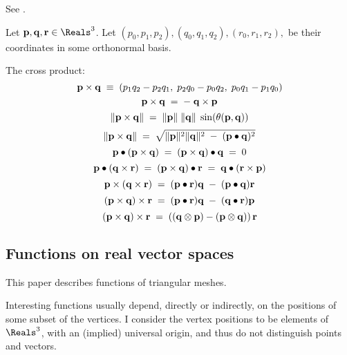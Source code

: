 See \cite[p. 85, ex. 4-9]{spivak-1965}.

Let $\p, \q, \r \in \Reals^3$.
Let $(p_0,p_1,p_2), (q_0,q_1,q_2), (r_0,r_1,r_2), $ be their coordinates
in some orthonormal basis.

The cross product:
\begin{equation}
{\mathbf p} \times {\mathbf q}  \; \equiv \; (p_1 q_2 - p_2 q_1, \; p_2 q_0 - p_0 q_2, \; p_0 q_1 - p_1 q_0)
\end{equation}
\begin{equation}
{\mathbf p} \times {\mathbf q}  \; = \; - \; {\mathbf q} \times {\mathbf p}
\end{equation}
\begin{equation}
\| {\mathbf p} \times {\mathbf q} \| \; = \; \| {\mathbf p} \| \; \| {\mathbf q} \| \; \sin(\theta({\mathbf p},{\mathbf q}))
\end{equation}
\begin{equation}
\| {\mathbf p} \times {\mathbf q} \|  \; = \;  \sqrt{\| {\mathbf p} \|^2 \| {\mathbf q} \|^2 \; - \; ({\mathbf p} \bullet {\mathbf q})^2}
\end{equation}
\begin{equation}
{\mathbf p} \bullet ( {\mathbf p} \times {\mathbf q} ) \; = \; ( {\mathbf p} \times {\mathbf q} ) \bullet {\mathbf q} \; = \; 0
\end{equation}
\begin{equation}
\label{eq:dot_cross}
{\mathbf p} \bullet ( {\mathbf q} \times {\mathbf r} ) \; = \; ( {\mathbf p} \times {\mathbf q} ) \bullet {\mathbf r} \; = \; {\mathbf q} \bullet ( {\mathbf r} \times {\mathbf p} )
\end{equation}
\begin{equation}
{\mathbf p} \times ( {\mathbf q} \times {\mathbf r} ) \; = \; ( {\mathbf p} \bullet {\mathbf r} ) {\mathbf q} \; - \; ({\mathbf p} \bullet {\mathbf q}) {\mathbf r}
\end{equation}
\begin{equation}
( {\mathbf p} \times {\mathbf q} ) \times {\mathbf r} \; = \; ( {\mathbf p} \bullet {\mathbf r} ) {\mathbf q} \; - \; ({\mathbf q} \bullet {\mathbf r}) {\mathbf p}
\end{equation}
\begin{equation}
( {\mathbf p} \times {\mathbf q} ) \times {\mathbf r} \; = \; \left(({\mathbf q} \otimes {\mathbf p}) - ({\mathbf p} \otimes {\mathbf q})\right) {\mathbf r}
\end{equation}



\subsection{Functions on real vector spaces}
\label{sec:functions}

This paper describes functions of triangular meshes.

Interesting functions usually depend, directly or indirectly,
on the positions of some subset of the vertices.
I consider the vertex positions to be elements of $\Reals^3$,
with an (implied) universal origin,
and thus do not distinguish points and vectors.

